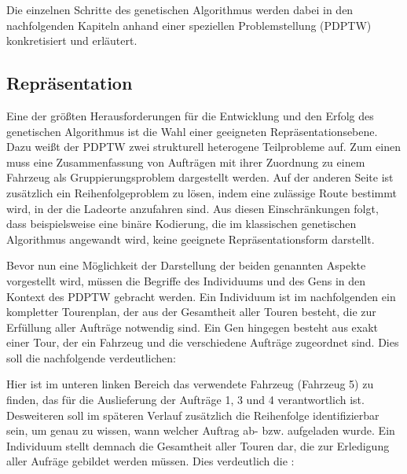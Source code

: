 Die einzelnen Schritte des genetischen Algorithmus werden dabei in den nachfolgenden Kapiteln anhand einer speziellen Problemstellung (PDPTW) konkretisiert und erläutert.

\subsection{Repräsentation}
Eine der größten Herausforderungen für die Entwicklung und den Erfolg des genetischen Algorithmus ist die Wahl einer geeigneten Repräsentationsebene. Dazu weißt der PDPTW zwei strukturell heterogene Teilprobleme auf. Zum einen muss eine Zusammenfassung von Aufträgen mit ihrer Zuordnung zu einem Fahrzeug als Gruppierungsproblem dargestellt werden. Auf der anderen Seite ist zusätzlich ein Reihenfolgeproblem zu lösen, indem eine zulässige Route bestimmt wird, in der die Ladeorte anzufahren sind. Aus diesen Einschränkungen folgt, dass beispielsweise eine binäre Kodierung, die im klassischen genetischen Algorithmus angewandt wird, keine geeignete Repräsentationsform darstellt. 

Bevor nun eine Möglichkeit der Darstellung der beiden genannten Aspekte vorgestellt wird, müssen die Begriffe des Individuums und des Gens in den Kontext des PDPTW gebracht werden. Ein Individuum ist im nachfolgenden ein kompletter Tourenplan, der aus der Gesamtheit aller Touren besteht, die zur Erfüllung aller Aufträge notwendig sind. Ein Gen hingegen besteht aus exakt einer Tour, der ein Fahrzeug und die verschiedene Aufträge zugeordnet sind. Dies soll die nachfolgende  verdeutlichen:


Hier ist im unteren linken Bereich das verwendete Fahrzeug (Fahrzeug 5) zu finden, das für die Auslieferung der Aufträge 1, 3 und 4 verantwortlich ist. Desweiteren soll im späteren Verlauf zusätzlich die Reihenfolge identifizierbar sein, um genau zu wissen, wann welcher Auftrag ab- bzw. aufgeladen wurde. Ein Individuum stellt demnach die Gesamtheit aller Touren dar, die zur Erledigung aller Aufräge gebildet werden müssen. Dies verdeutlich die :

